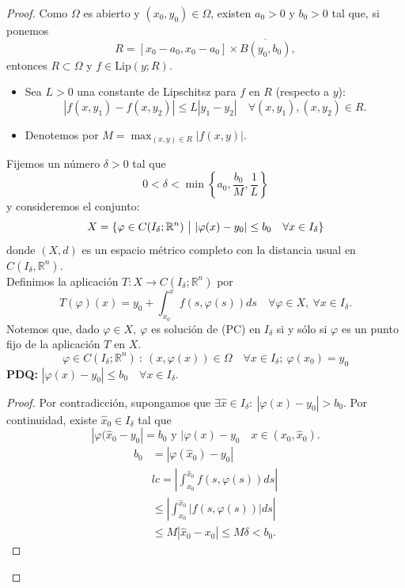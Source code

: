 \documentclass[11pt]{article}
\theoremstyle{definition} %
\newcommand{\R}{\mathbb{R}}
\begin{document}
\begin{proof}
	Como $\Omega$ es abierto y $(x_0,y_0) \in \Omega$, existen $a_0>0$ y $b_{0}>0$ tal que, si ponemos
	\[ R = [x_0-a_0,x_{0}-a_{0}] \times \overline{B(y_0,b_0)}, \]
	entonces $R \subset \Omega$ y $f \in \text{Lip}(y;R)$.
	\begin{itemize}
		\item Sea $L>0$ una constante de Lipschitsz para $f$ en $R$ (respecto a $y$):
		\[ |f(x,y_{1}) - f(x,y_{2})| \leq L |y_{1} - y_{2}|\quad \forall (x,y_{1}),(x,y_{2})\in R. \]

		\item Denotemos por $M = \max_{(x,y)\in R} |f(x,y)|$.
	\end{itemize}
	Fijemos un número $\delta>0$ tal que 
	\[ 0 < \delta < \min \left\{a_0, \frac{b_0}{M}, \frac{1}{L} \right\} \]
	y consideremos el conjunto:
	\[ X = \{ \varphi \in C(I_{\delta};\R^n) \ \big{|} \ |\varphi(x) - y_{0}| \leq b_{0} \quad \forall x \in I_{\delta} \} \]  
	donde $(X,d)$ es un espacio métrico completo con la distancia usual en $C(I_{\delta},\R^n)$. \\
	Definimos la aplicación $T: X \to C(I_{\delta};\R^n)$ por
	\[ T(\varphi)(x) = y_{0} + \int_{x_{0}}^{x} f(s,\varphi(s))ds \quad \forall \varphi \in X,\ \forall x \in I_{\delta}. \]
	Notemos que, dado $\varphi \in X, \ \varphi$ es solución de (PC) en $I_{\delta}$ si y sólo si $\varphi$ es un punto fijo de la aplicación $T$ en $X$.
	\[ \varphi \in C(I_{\delta};\R^n)\ : \ (x,\varphi(x)) \in \Omega \quad \forall x \in I_{\delta};\ \varphi(x_{0})=y_{0} \]
	\textbf{PDQ:} $|\varphi(x)-y_{0}| \leq b_{0}\quad \forall x \in I_{\delta}$.

	\begin{proof}
		Por contradicción, supongamos que $\exists \hat{x} \in I_{\delta}:\ |\varphi(x)-y_{0}| > b_{0}$. Por continuidad, existe $\hat{x}_0 \in I_{\delta}$ tal que 
		\[ |\varphi(\hat{x}_{0} - y_{0}| = b_{0} \text{ y } |\varphi(x) -y_{0}\quad x \in (x_{0},\hat{x}_0). \]
		\begin{align*}
			b_{0} & = |\varphi(\hat{x}_0)-y_{0}| \\ 
			&lc= \left| \int_{x_0}^{\hat{x}_0} f(s,\varphi(s))ds \right| \\
			& \leq \left| \int_{x_0}^{\hat{x}_0 } |f(s,\varphi(s))| ds \right| \\
			& \leq M |\hat{x}_0 - x_{0}| \leq M \delta < b_0 
		.\end{align*}
	\end{proof}


\end{proof}
\end{document}
